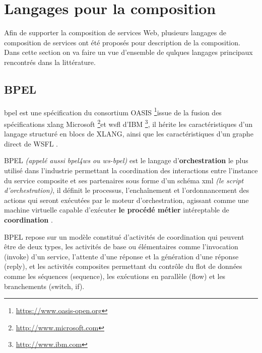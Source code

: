       \newpage
  \section{Langages pour la composition}
  \label{sec:lang-de-comp}
  Afin de supporter la composition de services Web, plusieurs langages de
  composition de services ont été proposés pour description de la
  composition. Dans cette section on va faire un vue d'ensemble
  de qulques langages principaux rencontrés dans la littérature.
    \subsection{BPEL}
    \label{sec:bpel}

    \acrshort{bpel} est une spécification du consortium OASIS
    \footnote{\url{https://www.oasis-open.org}}issue de la fusion des
    spécifications \acrshort{xlang} Microsoft
    \footnote{\url{http://www.microsoft.com}}et \acrshort{wsfl} d'IBM
    \footnote{\url{http://www.ibm.com}}, il hérite les
    caractéristiques d'un langage structuré en blocs de
    \textsc{XLANG}, ainsi que les caractéristiques d'un graphe direct
    de WSFL \cite{driss2011approche}.

    \textsc{BPEL} \textit{(appelé aussi \acrshort{bpel4ws} ou
      \acrshort{ws-bpel})} est le langage d'\textbf{orchestration}
    le plus utilisé dans l'industrie permettant la coordination des
    interactions entre l'instance du service composite et ses
    partenaires sous forme d'un schéma \acrshort{xml} \textit{(le
      script d'orchestration)}, il définit le processus,
    l'enchaînement et l'ordonnancement des actions qui seront
    exécutées par le moteur d'orchestration, agissant comme une
    machine virtuelle capable d'exécuter \textbf{le procédé métier}
    intéreptable de \textbf{coordination} \cite{chollet2009orchestration}.

    \textsc{BPEL} repose sur un modèle constitué d'activités de
    coordination qui peuvent être de deux types, les activités de base
    ou élémentaires comme l'invocation (invoke) d'un service,
    l'attente d'une réponse et la génération d'une réponse (reply), et
    les activités composites permettant du contrôle du flot de données
    comme les séquences (sequence), les exécutions en parallèle (flow)
    et les branchements (switch, if).

